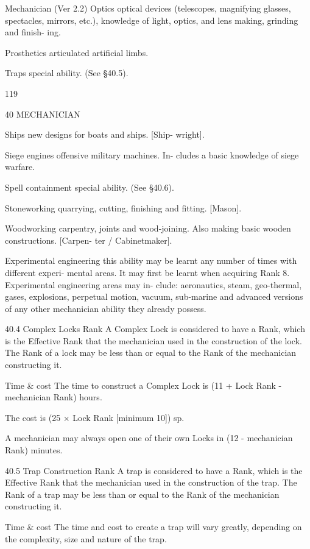 \begin{Chapter}{Mechanician (Ver 2.2)}
Optics  optical  devices  (telescopes,  magnifying 
glasses,  spectacles,  mirrors,  etc.),  knowledge  of 
light, optics, and lens making, grinding and finish-
ing. 

Prosthetics articulated artificial limbs. 

Traps special ability. (See §40.5). 

119 

40 MECHANICIAN 

Ships  new  designs  for  boats  and  ships.  [Ship-
wright]. 

Siege  engines  offensive  military  machines.  In-
cludes a basic knowledge of siege warfare. 

Spell containment special ability. (See §40.6). 

Stoneworking  quarrying,  cutting,  finishing  and 
fitting. [Mason]. 

Woodworking carpentry, joints and wood-joining. 
Also making basic wooden constructions. [Carpen-
ter / Cabinetmaker]. 

Experimental  engineering  this  ability  may  be 
learnt  any  number  of  times  with  different  experi-
mental areas. It may first be learnt when acquiring 
Rank  8.  Experimental  engineering  areas  may  in-
clude:  aeronautics,  steam,  geo-thermal,  gases, 
explosions,  perpetual  motion,  vacuum,  sub-marine 
and  advanced  versions  of  any  other  mechanician 
ability they already possess. 

40.4 Complex Locks 
Rank  A  Complex  Lock  is  considered  to  have  a 
Rank,  which  is  the  Effective  Rank  that  the 
mechanician  used  in  the  construction  of  the  lock. 
The Rank of a lock may be less than or equal to the 
Rank of the mechanician constructing it. 

Time  \&  cost  The  time  to  construct  a  Complex 
Lock  is  (11  +  Lock  Rank  -  mechanician  Rank) 
hours. 

The cost is (25 × Lock Rank [minimum 10]) sp. 

A mechanician may always open one of their own 
Locks in (12 - mechanician Rank) minutes. 

40.5 Trap Construction 
Rank  A  trap  is  considered  to  have  a  Rank,  which 
is the Effective Rank that the mechanician used in 
the  construction  of  the  trap.  The  Rank  of  a  trap 
may  be  less  than  or  equal  to  the  Rank  of  the 
mechanician constructing it. 

Time \& cost The time and cost to create a trap will 
vary  greatly,  depending  on  the  complexity,  size 
and nature of the trap. 


\end{Chapter}
